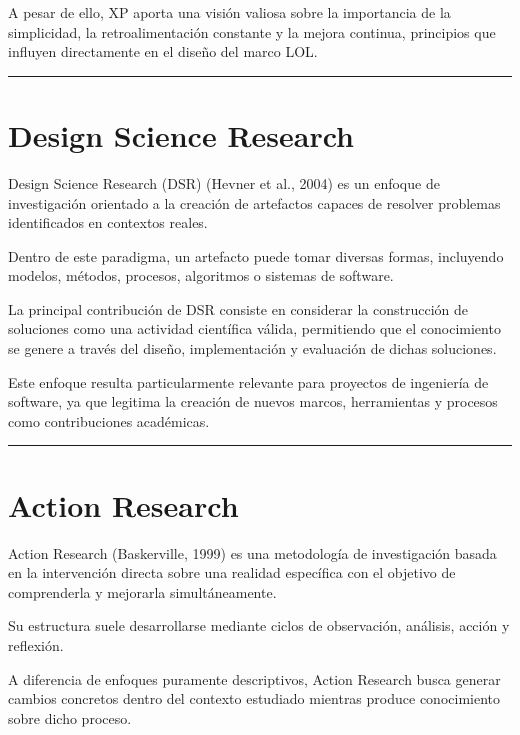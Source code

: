 \documentclass[14pt,a4paper,oneside]{extbook}
\begin{document}
A pesar de ello, XP aporta una visión valiosa sobre la importancia de la simplicidad, la retroalimentación constante y la mejora continua, principios que influyen directamente en el diseño del marco LOL.

\par\vspace{1.5em}\noindent\hfill\rule{0.25\textwidth}{0.6pt}\hfill\par\vspace{1.5em}

\section{Design Science Research}

Design Science Research (DSR) (Hevner et al., 2004) es un enfoque de investigación orientado a la creación de artefactos capaces de resolver problemas identificados en contextos reales.

Dentro de este paradigma, un artefacto puede tomar diversas formas, incluyendo modelos, métodos, procesos, algoritmos o sistemas de software.

La principal contribución de DSR consiste en considerar la construcción de soluciones como una actividad científica válida, permitiendo que el conocimiento se genere a través del diseño, implementación y evaluación de dichas soluciones.

Este enfoque resulta particularmente relevante para proyectos de ingeniería de software, ya que legitima la creación de nuevos marcos, herramientas y procesos como contribuciones académicas.

\par\vspace{1.5em}\noindent\hfill\rule{0.25\textwidth}{0.6pt}\hfill\par\vspace{1.5em}

\section{Action Research}

Action Research (Baskerville, 1999) es una metodología de investigación basada en la intervención directa sobre una realidad específica con el objetivo de comprenderla y mejorarla simultáneamente.

Su estructura suele desarrollarse mediante ciclos de observación, análisis, acción y reflexión.

A diferencia de enfoques puramente descriptivos, Action Research busca generar cambios concretos dentro del contexto estudiado mientras produce conocimiento sobre dicho proceso.
\end{document}
